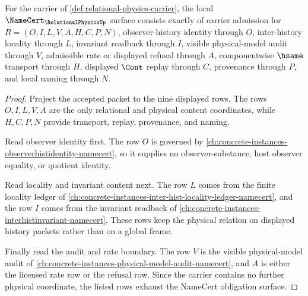 \begin{theorem}
\label{thm:relational-physics-namecert-obligations}
For the carrier of \autoref{def:relational-physics-carrier}, the local $\NameCert_{\RelationalPhysicsUp}$ surface consists exactly of carrier admission for $R=(O,I,L,V,A,H,C,P,N)$, observer-history identity through $O$, inter-history locality through $L$, invariant readback through $I$, visible physical-model audit through $V$, admissible rate or displayed refusal through $A$, componentwise $\hsame$ transport through $H$, displayed $\Cont$ replay through $C$, provenance through $P$, and local naming through $N$.
\end{theorem}
\begin{proof}
Project the accepted packet to the nine displayed rows. The rows $O,I,L,V,A$ are the only relational and physical content coordinates, while $H,C,P,N$ provide transport, replay, provenance, and naming.

Read observer identity first. The row $O$ is governed by \autoref{ch:concrete-instances-observerhistidentity-namecert}, so it supplies no observer-substance, host observer equality, or quotient identity.

Read locality and invariant content next. The row $L$ comes from the finite locality ledger of \autoref{ch:concrete-instances-inter-hist-locality-ledger-namecert}, and the row $I$ comes from the invariant readback of \autoref{ch:concrete-instances-interhistinvariant-namecert}. These rows keep the physical relation on displayed history packets rather than on a global frame.

Finally read the audit and rate boundary. The row $V$ is the visible physical-model audit of \autoref{ch:concrete-instances-physical-model-audit-namecert}, and $A$ is either the licensed rate row or the refusal row. Since the carrier contains no further physical coordinate, the listed rows exhaust the NameCert obligation surface.
\end{proof}

